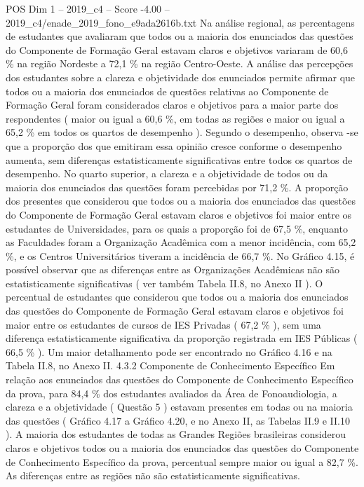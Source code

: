 \begin{textsample}{POS Dim 1 – 2019\_c4 – Score -4.00 – 2019\_c4/enade\_2019\_fono\_e9ada2616b.txt}
Na análise regional, as percentagens de estudantes que avaliaram que todos ou a maioria dos enunciados das questões do Componente de Formação Geral estavam claros e objetivos variaram de 60,6 \% na região Nordeste a 72,1 \% na região Centro-Oeste.
A análise das percepções dos estudantes sobre a clareza e objetividade dos enunciados permite afirmar que todos ou a maioria dos enunciados de questões relativas ao Componente de Formação Geral foram considerados claros e objetivos para a maior parte dos respondentes ( maior ou igual a 60,6 \%, em todas as regiões e maior ou igual a 65,2 \% em todos os quartos de desempenho ).
Segundo o desempenho, observa -se que a proporção dos que emitiram essa opinião cresce conforme o desempenho aumenta, sem diferenças estatisticamente significativas entre todos os quartos de desempenho.
No quarto superior, a clareza e a objetividade de todos ou da maioria dos enunciados das questões foram percebidas por 71,2 \%.
A proporção dos presentes que considerou que todos ou a maioria dos enunciados das questões do Componente de Formação Geral estavam claros e objetivos foi maior entre os estudantes de Universidades, para os quais a proporção foi de 67,5 \%, enquanto as Faculdades foram a Organização Acadêmica com a menor incidência, com 65,2 \%, e os Centros Universitários tiveram a incidência de 66,7 \%.
No Gráfico 4.15, é possível observar que as diferenças entre as Organizações Acadêmicas não são estatisticamente significativas ( ver também Tabela II.8, no Anexo II ).
O percentual de estudantes que considerou que todos ou a maioria dos enunciados das questões do Componente de Formação Geral estavam claros e objetivos foi maior entre os estudantes de cursos de IES Privadas ( 67,2 \% ), sem uma diferença estatisticamente significativa da proporção registrada em IES Públicas ( 66,5 \% ).
Um maior detalhamento pode ser encontrado no Gráfico 4.16 e na Tabela II.8, no Anexo II. 4.3.2 Componente de Conhecimento Específico Em relação aos enunciados das questões do Componente de Conhecimento Específico da prova, para 84,4 \% dos estudantes avaliados da Área de Fonoaudiologia, a clareza e a objetividade ( Questão 5 ) estavam presentes em todas ou na maioria das questões ( Gráfico 4.17 a Gráfico 4.20, e no Anexo II, as Tabelas II.9 e II.10 ).
A maioria dos estudantes de todas as Grandes Regiões brasileiras considerou claros e objetivos todos ou a maioria dos enunciados das questões do Componente de Conhecimento Específico da prova, percentual sempre maior ou igual a 82,7 \%.
As diferenças entre as regiões não são estatisticamente significativas.

\end{textsample}
